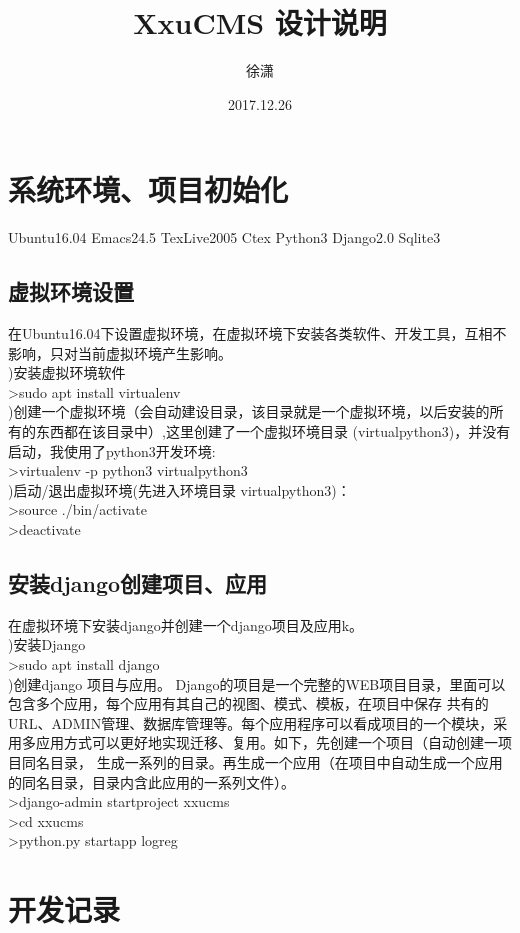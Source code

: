 \documentclass{ctexart}
\author{徐潇}
\title{XxuCMS 设计说明}
\date{2017.12.26}
\begin{document}
  \maketitle  %

  \section{系统环境、项目初始化}
  Ubuntu16.04 Emacs24.5 TexLive2005 Ctex Python3 Django2.0 Sqlite3
   \subsection{虚拟环境设置}
      在Ubuntu16.04下设置虚拟环境，在虚拟环境下安装各类软件、开发工具，互相不影响，只对当前虚拟环境产生影响。\\    
      )安装虚拟环境软件\\      
      \indent >sudo apt install virtualenv \\
      )创建一个虚拟环境（会自动建设目录，该目录就是一个虚拟环境，以后安装的所有的东西都在该目录中）,这里创建了一个虚拟环境目录
      (virtualpython3)，并没有启动，我使用了python3开发环境:\\
       \indent>virtualenv -p python3 virtualpython3 \\            
       )启动/退出虚拟环境(先进入环境目录 virtualpython3)：\\
       \indent >source ./bin/activate \\
       \indent >deactivate \\
    \subsection{安装django创建项目、应用}
      在虚拟环境下安装django并创建一个django项目及应用k。\\
      )安装Django \\
      \indent >sudo apt install django \\
      )创建django 项目与应用。 Django的项目是一个完整的WEB项目目录，里面可以包含多个应用，每个应用有其自己的视图、模式、模板，在项目中保存
      共有的URL、ADMIN管理、数据库管理等。每个应用程序可以看成项目的一个模块，采用多应用方式可以更好地实现迁移、复用。如下，先创建一个项目（自动创建一项目同名目录，
      生成一系列的目录。再生成一个应用（在项目中自动生成一个应用的同名目录，目录内含此应用的一系列文件）。\\
      \indent >django-admin startproject xxucms \\
      \indent >cd xxucms \\ 
      \indent >python.py startapp logreg \\
      \indent

  \newpage
  \section{开发记录}
    \subsection{}
      
      
   
  
    
  
\end{document}
